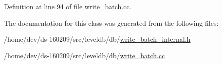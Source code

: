 Definition at line 94 of file write\+\_\+batch.\+cc.



The documentation for this class was generated from the following files\+:\begin{DoxyCompactItemize}
\item 
/home/dev/ds-\/160209/src/leveldb/db/\hyperlink{write__batch__internal_8h}{write\+\_\+batch\+\_\+internal.\+h}\item 
/home/dev/ds-\/160209/src/leveldb/db/\hyperlink{write__batch_8cc}{write\+\_\+batch.\+cc}\end{DoxyCompactItemize}
